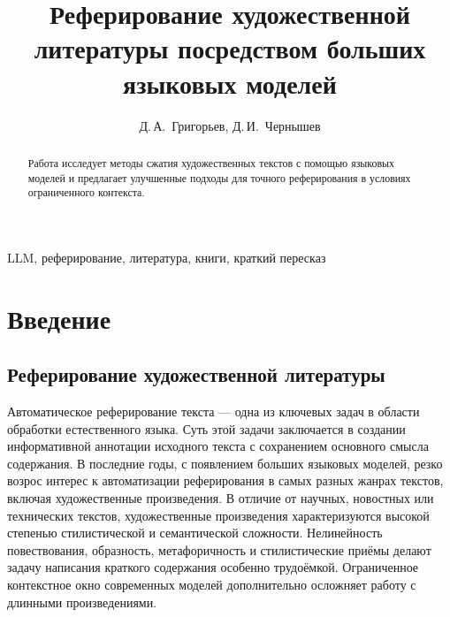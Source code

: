 \documentclass{article}
\theoremstyle{definition}
\theoremstyle{plain}
\begin{document}


\title{Реферирование художественной литературы посредством больших языковых моделей}

\author{Д.\,А.~Григорьев\Addressmark[1]\Emailmark[1], Д.\,И.~Чернышев\Addressmark[1]\Emailmark[2]}








\maketitle

\begin{abstract}
Работа исследует методы сжатия художественных текстов с помощью языковых моделей и предлагает улучшенные подходы для точного реферирования в условиях ограниченного контекста.
\end{abstract}

\begin{keywords}
LLM, реферирование, литература, книги, краткий пересказ
\end{keywords}

\section*{Введение}
\subsection*{Реферирование художественной литературы}
Автоматическое реферирование текста — одна из ключевых задач в области обработки естественного языка. Суть этой задачи заключается в создании информативной аннотации исходного текста с сохранением основного смысла содержания. В последние годы, с появлением больших языковых моделей, резко возрос интерес к автоматизации реферирования в самых разных жанрах текстов, включая художественные произведения. В отличие от научных, новостных или технических текстов, художественные произведения характеризуются высокой степенью стилистической и семантической сложности. Нелинейность повествования, образность, метафоричность и стилистические приёмы делают задачу написания краткого содержания особенно трудоёмкой. Ограниченное контекстное окно современных моделей дополнительно осложняет работу с длинными произведениями.
\end{document}

